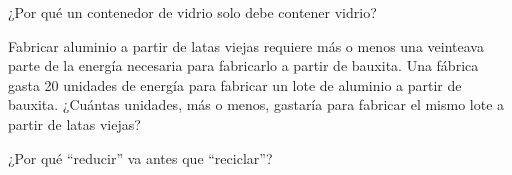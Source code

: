 \begin{exercise}[$\star$]\label{exo:g5:raw-materials-and-recycling:9}
¿Por qué un contenedor de vidrio solo debe contener vidrio?
\end{exercise}

\begin{exercise}[$\star\star$]\label{exo:g5:raw-materials-and-recycling:10}
Fabricar aluminio a partir de latas viejas requiere más o menos una
veinteava parte de la energía necesaria para fabricarlo a partir de
bauxita. Una fábrica gasta 20 unidades de energía para fabricar un lote
de aluminio a partir de bauxita. ¿Cuántas unidades, más o menos,
gastaría para fabricar el mismo lote a partir de latas viejas?
\end{exercise}

\begin{exercise}[$\star\star$]\label{exo:g5:raw-materials-and-recycling:11}
¿Por qué ``reducir'' va antes que ``reciclar''?
\end{exercise}
